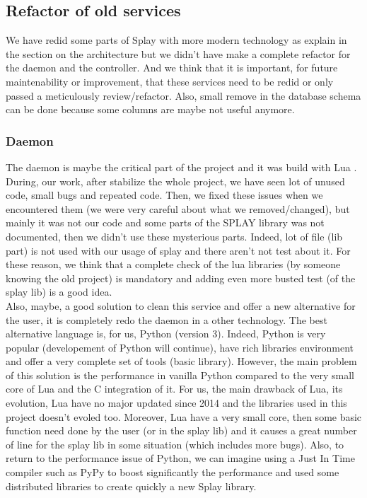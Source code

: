 \documentclass{eplmastersthesis}
\begin{document}
      \subsection{Refactor of old services}
        We have redid some parts of Splay with more modern technology as explain in the section on the architecture but
        we didn't have make a complete refactor for the daemon and the controller. And we think that it is important,
        for future maintenability or improvement, that these services need to be redid or only passed a meticulously review/refactor.
        Also, small remove in the database schema can be done because some columns are maybe not useful anymore.

        \subsubsection{Daemon}
          The daemon is maybe the critical part of the project and it was build with Lua \cite{Lua}. During, our work, after
          stabilize the whole project, we have seen lot of unused code, small bugs and repeated code. Then,
          we fixed these issues when we encountered them (we were very careful about what we removed/changed), but
          mainly it was not our code and some parts of the SPLAY library was not documented, then we didn't use these
          mysterious parts. Indeed, lot of file (lib part) is not used with our usage of splay and there aren't not test
          about it. For these reason, we think that a complete check of the lua libraries (by someone knowing the old project) is mandatory
          and adding even more busted test (of the splay lib) is a good idea. \\

          Also, maybe, a good solution to clean this service and offer a new alternative for the user, it is completely
          redo the daemon in a other technology. The best alternative language is, for us, Python (version 3). Indeed, Python is very
          popular (developement of Python will continue), have rich libraries environment and offer a very complete
          set of tools (basic library). However, the main problem of this solution is the performance in vanilla Python compared
          to the very small core of Lua and the C integration of it. For us, the main drawback of Lua, its evolution, Lua have no
          major updated since 2014 and the libraries used in this project doesn't evoled too.
          Moreover, Lua have a very small core, then some basic function need done by the user (or in the splay lib) and
          it causes a great number of line for the splay lib in some situation (which includes more bugs). Also, to return
          to the performance issue of Python, we can imagine using a Just In Time compiler such as PyPy \cite{PyPy} to boost
          significantly the performance and used some distributed libraries to create quickly a new Splay library.
\end{document}

